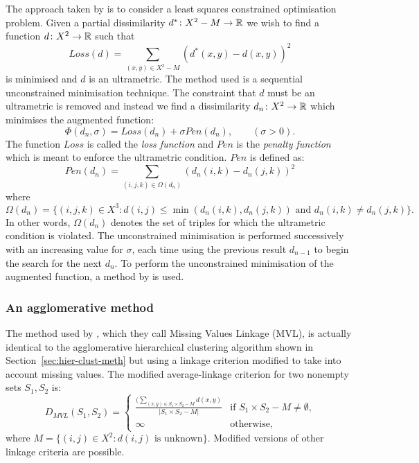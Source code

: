 The approach taken by \citet{de1984ultrametric} is to consider a least squares
constrained optimisation problem.  Given a partial dissimilarity $d^* \colon
X^2 - M \to {\mathbb R}$ we wish to find a function $d \colon X^2 \to {\mathbb R}$
such that
\begin{equation*}
  \label{eq:partial-dist-least-squares}
  Loss(d) = \sum_{(x,y) \in X^2 - M} (d^*(x,y)-d(x,y))^2
\end{equation*}
is minimised and $d$ is an ultrametric.  The method used is a sequential
unconstrained minimisation technique.  The constraint that $d$ must be an
ultrametric is removed and instead we find a dissimilarity $d_n \colon X^2 \to
{\mathbb R}$ which minimises the augmented function:
\begin{equation*}
  \label{eq:partial-dist-optimisation}
  \Phi(d_n,\sigma) = Loss(d_n) + \sigma Pen(d_n), \qquad (\sigma > 0).
\end{equation*}
The function $Loss$ is called the \textit{loss function} and $Pen$ is the
\textit{penalty function} which is meant to enforce the ultrametric
condition.  $Pen$ is defined as:
\begin{equation*}
  \label{eq:penalty-function}
  Pen(d_n) = \sum_{(i,j,k) \in \Omega(d_n)} (d_n(i,k) - d_n(j,k))^2
\end{equation*}
where
\begin{equation*}
  \Omega(d_n) = \{(i,j,k) \in X^3 \colon d(i,j) \leq \min(d_n(i,k),d_n(j,k))
  \text{ and } d_n(i,k) \neq d_n(j,k)\}.
\end{equation*}
In other words, $\Omega(d_n)$ denotes the set of triples for which the
ultrametric condition is violated.  The unconstrained minimisation is
performed successively with an increasing value for $\sigma$, each time using
the previous result $d_{n-1}$ to begin the search for the next $d_n$.  To
perform the unconstrained minimisation of the augmented function, a method by
\citet{powell1977restart} is used.

\subsubsection{An agglomerative method}
\label{sec:part-dist-agglom-method}

The method used by \citet{schader1992mvl}, which they call Missing Values
Linkage (MVL), is actually identical to the agglomerative hierarchical
clustering algorithm shown in Section~\ref{sec:hier-clust-meth} but using a
linkage criterion modified to take into account missing values.  The modified
average-linkage criterion for two nonempty sets $S_1, S_2$ is:
\begin{equation*}
  D_{MVL}(S_1,S_2) =
  \begin{cases}
    \displaystyle
    \frac{(\sum_{(x,y) \in S_1 \times S_2 - M} d(x,y)}{|S_1 \times S_2 - M|} & \text{if $S_1
      \times S_2 - M \neq \emptyset$,} \\
    \infty & \text{otherwise},
  \end{cases}
\end{equation*}
where $M = \{(i,j) \in X^2 \colon d(i,j) \text{ is unknown}\}$.  Modified
versions of other linkage criteria are possible.

